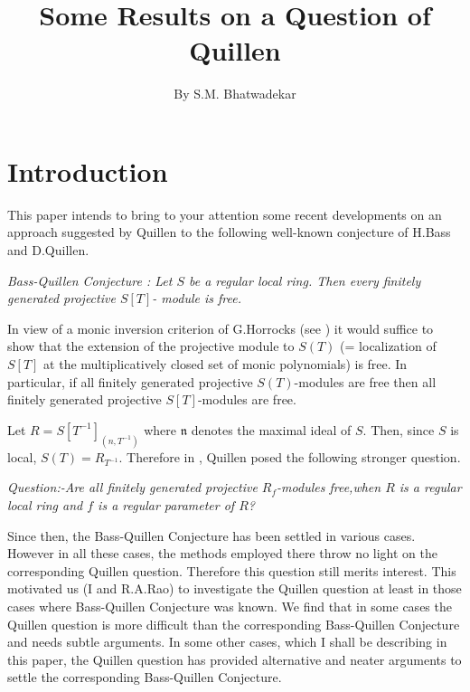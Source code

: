 \title{Some Results on a Question of Quillen}\label{chap3}

\author{By S.\@ M. Bhatwadekar}

\date{}
\maketitle

\setcounter{page}{79}

\setcounter{pageoriginal}{106}

\section{Introduction}\pageoriginale\label{chap3-sec1}

This paper intends to bring to your attention some recent developments
on an approach suggested by Quillen to the following well-known
conjecture of H.\@ Bass and D.\@ Quillen. 

{\em Bass-Quillen Conjecture : Let $S$ be a regular local ring. Then
every finitely generated projective $S[T]$- module is free.}
  
In view of a monic inversion criterion of G.\@ Horrocks
(see \cite{chap3-H}) it would suffice to show that the extension of
the projective module to $S(T)$ (= localization of $S[T]$ at the
multiplicatively closed set of monic polynomials) is free. In
particular, if all finitely generated projective $S(T)$-modules are
free then all finitely generated projective $S[T]$-modules are free.

Let $R=S[T^{-1}]_{(n,T^{-1})}$ where $\mathfrak{n}$ denotes the
maximal ideal of $S$. Then, since $S$ is local,
$S(T)=R_{T^{-1}}$. Therefore in \cite{chap3-Q}, Quillen posed the
following stronger question. 

{\em Question:-\pageoriginale Are all finitely generated projective
$R_{f}$-modules free,\break when $R$ is a regular local ring and $f$ is a
regular parameter of $R$?}

Since then, the Bass-Quillen Conjecture has been settled
in various 
cases. However in all these cases, the methods employed there throw no
light on the corresponding Quillen question. Therefore this question
still merits interest. This motivated us (I and R.\@ A.\@ Rao) to
investigate the Quillen question at least in those cases where
Bass-Quillen Conjecture was known. We find that in some cases the
Quillen question is more difficult than the corresponding Bass-Quillen
Conjecture and needs subtle arguments. In some other cases, which I
shall be describing in this paper, the Quillen question has provided
alternative and neater arguments to settle the corresponding
Bass-Quillen Conjecture.

